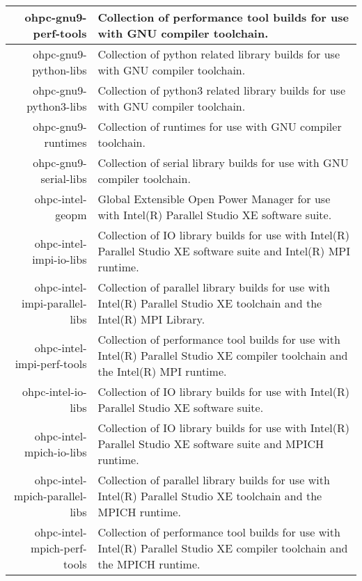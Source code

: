 \begin{tabularx}{\textwidth}{r|X}
\hline
ohpc-gnu9-perf-tools & Collection of performance tool builds for use with GNU compiler toolchain. \\ 
\hline
ohpc-gnu9-python-libs & Collection of python related library builds for use with GNU compiler toolchain. \\ 
\hline
ohpc-gnu9-python3-libs & Collection of python3 related library builds for use with GNU compiler toolchain. \\ 
\hline
ohpc-gnu9-runtimes & Collection of runtimes for use with GNU compiler toolchain. \\ 
\hline
ohpc-gnu9-serial-libs & Collection of serial library builds for use with GNU compiler toolchain. \\ 
\hline
ohpc-intel-geopm & Global Extensible Open Power Manager for use with Intel(R) Parallel Studio XE software suite. \\ 
\hline
ohpc-intel-impi-io-libs & Collection of IO library builds for use with Intel(R) Parallel Studio XE software suite and Intel(R) MPI runtime. \\ 
\hline
ohpc-intel-impi-parallel-libs & Collection of parallel library builds for use with Intel(R) Parallel Studio XE toolchain and the Intel(R) MPI Library. \\ 
\hline
ohpc-intel-impi-perf-tools & Collection of performance tool builds for use with Intel(R) Parallel Studio XE compiler toolchain and the Intel(R) MPI runtime. \\ 
\hline
ohpc-intel-io-libs & Collection of IO library builds for use with Intel(R) Parallel Studio XE software suite. \\ 
\hline
ohpc-intel-mpich-io-libs & Collection of IO library builds for use with Intel(R) Parallel Studio XE software suite and MPICH runtime. \\ 
\hline
ohpc-intel-mpich-parallel-libs & Collection of parallel library builds for use with Intel(R) Parallel Studio XE toolchain and the MPICH runtime. \\ 
\hline
ohpc-intel-mpich-perf-tools & Collection of performance tool builds for use with Intel(R) Parallel Studio XE compiler toolchain and the MPICH runtime. \\ 
\hline
\bottomrule
\end{tabularx}
